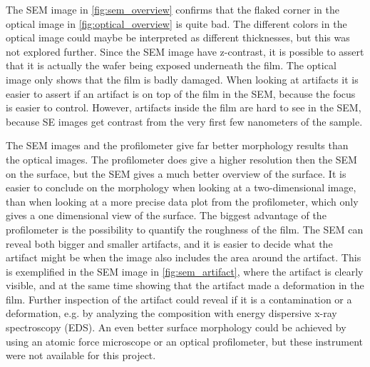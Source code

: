 The SEM image in \autoref{fig:sem_overview} confirms that the flaked corner in the optical image in \autoref{fig:optical_overview} is quite bad.
The different colors in the optical image could maybe be interpreted as different thicknesses, but this was not explored further.
Since the SEM image have z-contrast, it is possible to assert that it is actually the wafer being exposed underneath the film.
The optical image only shows that the film is badly damaged.
When looking at artifacts it is easier to assert if an artifact is on top of the film in the SEM, because the focus is easier to control.
However, artifacts inside the film are hard to see in the SEM, because SE images get contrast from the very first few nanometers of the sample.

The SEM images and the profilometer give far better morphology results than the optical images.
The profilometer does give a higher resolution then the SEM on the surface, but the SEM gives a much better overview of the surface.
It is easier to conclude on the morphology when looking at a two-dimensional image, than when looking at a more precise data plot from the profilometer, which only gives a one dimensional view of the surface.
The biggest advantage of the profilometer is the possibility to quantify the roughness of the film.
The SEM can reveal both bigger and smaller artifacts, and it is easier to decide what the artifact might be when the image also includes the area around the artifact.
This is exemplified in the SEM image in \autoref{fig:sem_artifact}, where the artifact is clearly visible, and at the same time showing that the artifact made a deformation in the film.
Further inspection of the artifact could reveal if it is a contamination or a deformation, e.g. by analyzing the composition with energy dispersive x-ray spectroscopy (EDS).
An even better surface morphology could be achieved by using an atomic force microscope or an optical profilometer, but these instrument were not available for this project.